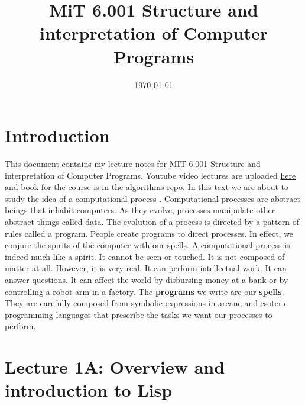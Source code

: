 \documentclass[a4paper,twoside]{article}
\numberwithin{equation}{section}
\begin{document}
%



\title{MiT 6.001 Structure and interpretation of Computer Programs} \author{} \date{\today} \maketitle \thispagestyle{empty}



\setcounter{page}{1}

\tableofcontents
\newpage
\setcounter{section}{0}
\setcounter{page}{1}

\section{Introduction}
\label{Introduction}
This document contains my lecture notes for
\href{https://ocw.mit.edu/courses/electrical-engineering-and-computer-science/6-001-structure-and-
    interpretation-of-computer-programs-spring-2005/index.html}{MIT 6.001}
Structure and
interpretation of Computer Programs. Youtube video lectures are uploaded
\href{https://www.youtube.com/watch?v=-J_xL4iGhJA&list=PLE18841CABEA24090&index=2}{here} and book
for the course is in the algorithms \href{https://github.com/ngocuong0105/algorithms}{repo}.
In this text we are about to study the idea of a computational process .
Computational processes are abstract beings that inhabit computers.
As they evolve, processes manipulate other abstract things called data. The evolution of a process is
directed by a pattern of rules called a program. People create programs to direct processes.
In effect, we conjure the spirits of the computer with our spells. A computational process is
indeed much like a spirit. It cannot be seen or touched. It is not composed of matter at all.
However, it is very real. It can perform intellectual work. It can answer
questions. It can affect the world by disbursing money at a bank or by
controlling a robot arm in a factory. The \textbf{programs} we write are our \textbf{spells}.
They are carefully composed from symbolic expressions in arcane and esoteric programming languages
that prescribe the tasks we want our processes to perform.

\section{Lecture 1A: Overview and introduction to Lisp}
\label{Lecture 1A}
\end{document}
